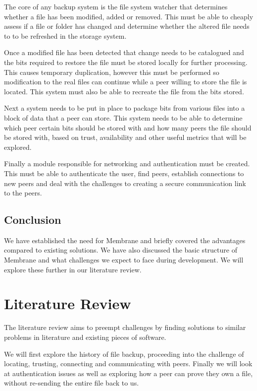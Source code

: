\documentclass[11pt, a4paper, twocolumn, twoside]{report}
\begin{document}
The core of any backup system is the file system watcher that determines whether a file has been modified, added or removed. This must be able to cheaply assess if a file or folder has changed and determine whether the altered file needs to to be refreshed in the storage system.

Once a modified file has been detected that change needs to be catalogued and the bits required to restore the file must be stored locally for further processing. This causes temporary duplication, however this must be performed so modification to the real files can continue while a peer willing to store the file is located. This system must also be able to recreate the file from the bits stored.

Next a system needs to be put in place to package bits from various files into a block of data that a peer can store. This system needs to be able to determine which peer certain bits should be stored with and how many peers the file should be stored with, based on trust, availability and other useful metrics that will be explored.

Finally a module responsible for networking and authentication must be created. This must be able to authenticate the user, find peers, establish connections to new peers and deal with the challenges to creating a secure communication link to the peers.

\section{Conclusion}

We have established the need for Membrane and briefly covered the advantages compared to existing solutions. We have also discussed the basic structure of Membrane and what challenges we expect to face during development. We will explore these further in our literature review.

\chapter{Literature Review}

The literature review aims to preempt challenges by finding solutions to similar problems in literature and existing pieces of software.

We will first explore the history of file backup, proceeding into the challenge of locating, trusting, connecting and communicating with peers. Finally we will look at authentication issues as well as exploring how a peer can prove they own a file, without re-sending the entire file back to us.
\end{document}
